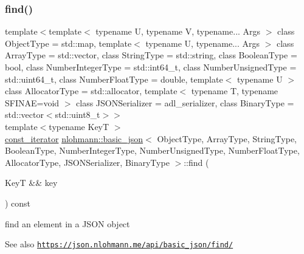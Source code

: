 \subsubsection{\texorpdfstring{find()}{find()}\hspace{0.1cm}{\footnotesize\ttfamily [2/2]}}
{\footnotesize\ttfamily template$<$template$<$ typename U, typename V, typename... Args $>$ class Object\+Type = std\+::map, template$<$ typename U, typename... Args $>$ class Array\+Type = std\+::vector, class String\+Type  = std\+::string, class Boolean\+Type  = bool, class Number\+Integer\+Type  = std\+::int64\+\_\+t, class Number\+Unsigned\+Type  = std\+::uint64\+\_\+t, class Number\+Float\+Type  = double, template$<$ typename U $>$ class Allocator\+Type = std\+::allocator, template$<$ typename T, typename S\+F\+I\+N\+A\+E=void $>$ class J\+S\+O\+N\+Serializer = adl\+\_\+serializer, class Binary\+Type  = std\+::vector$<$std\+::uint8\+\_\+t$>$$>$ \\
template$<$typename KeyT $>$ \\
\hyperlink{classnlohmann_1_1basic__json_aebd2cfa7e4ded4e97cde9269bfeeea38}{const\+\_\+iterator} \hyperlink{classnlohmann_1_1basic__json}{nlohmann\+::basic\+\_\+json}$<$ Object\+Type, Array\+Type, String\+Type, Boolean\+Type, Number\+Integer\+Type, Number\+Unsigned\+Type, Number\+Float\+Type, Allocator\+Type, J\+S\+O\+N\+Serializer, Binary\+Type $>$\+::find (\begin{DoxyParamCaption}\item[{KeyT \&\&}]{key }\end{DoxyParamCaption}) const\hspace{0.3cm}{\ttfamily [inline]}}



find an element in a J\+S\+ON object 

\begin{DoxySeeAlso}{See also}
\href{https://json.nlohmann.me/api/basic_json/find/}{\tt https\+://json.\+nlohmann.\+me/api/basic\+\_\+json/find/} 
\end{DoxySeeAlso}
\mbox{\label{classnlohmann_1_1basic__json_ab7aa6e048e659481a036f2d872c7cba6}} 
